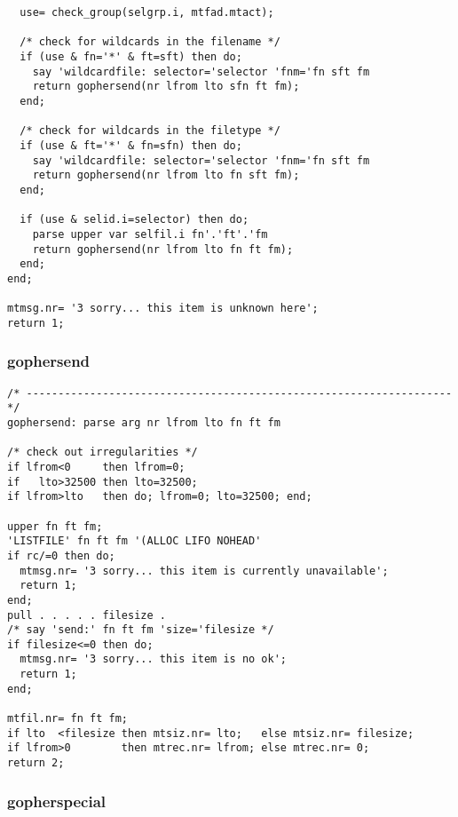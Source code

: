 \begin{verbatim}
  use= check_group(selgrp.i, mtfad.mtact);

  /* check for wildcards in the filename */
  if (use & fn='*' & ft=sft) then do;
    say 'wildcardfile: selector='selector 'fnm='fn sft fm
    return gophersend(nr lfrom lto sfn ft fm);
  end;

  /* check for wildcards in the filetype */
  if (use & ft='*' & fn=sfn) then do;
    say 'wildcardfile: selector='selector 'fnm='fn sft fm
    return gophersend(nr lfrom lto fn sft fm);
  end;

  if (use & selid.i=selector) then do;
    parse upper var selfil.i fn'.'ft'.'fm
    return gophersend(nr lfrom lto fn ft fm);
  end;
end;

mtmsg.nr= '3 sorry... this item is unknown here';
return 1; 
\end{verbatim}

\subsubsection{gophersend}

\def\LPtopF{gophersend}

\begin{verbatim}
/* ------------------------------------------------------------------- */
gophersend: parse arg nr lfrom lto fn ft fm

/* check out irregularities */
if lfrom<0     then lfrom=0;
if   lto>32500 then lto=32500;
if lfrom>lto   then do; lfrom=0; lto=32500; end;

upper fn ft fm;
'LISTFILE' fn ft fm '(ALLOC LIFO NOHEAD'
if rc/=0 then do;
  mtmsg.nr= '3 sorry... this item is currently unavailable';
  return 1;
end;
pull . . . . . filesize .
/* say 'send:' fn ft fm 'size='filesize */
if filesize<=0 then do;
  mtmsg.nr= '3 sorry... this item is no ok';
  return 1;
end;

mtfil.nr= fn ft fm;
if lto  <filesize then mtsiz.nr= lto;   else mtsiz.nr= filesize;
if lfrom>0        then mtrec.nr= lfrom; else mtrec.nr= 0;
return 2; 
\end{verbatim}

\subsubsection{gopherspecial}

\def\LPtopF{gopherspecial}

